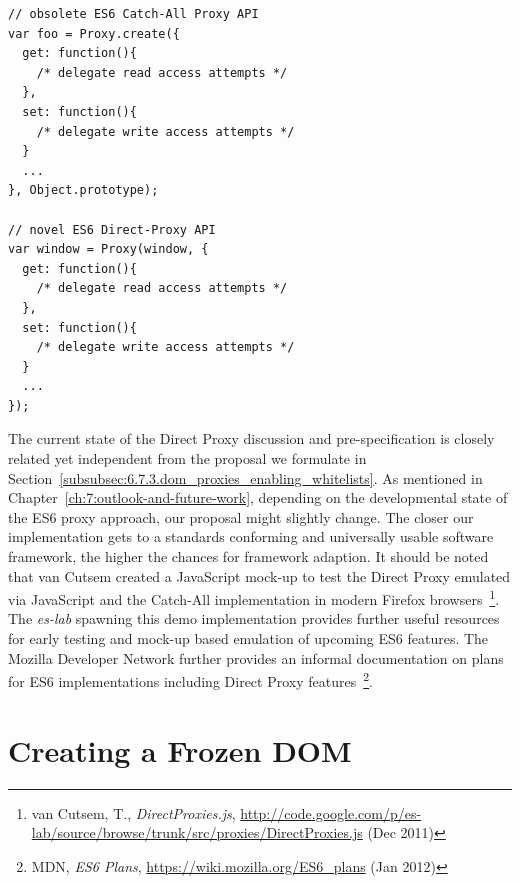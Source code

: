 \begin{lstlisting}[captionpos=b,label=lst:proxy-example-code,caption=Example code for Catch-All and Direct-Proxy implementations]
// obsolete ES6 Catch-All Proxy API
var foo = Proxy.create({
  get: function(){
    /* delegate read access attempts */
  },
  set: function(){
    /* delegate write access attempts */
  }
  ...
}, Object.prototype); 

// novel ES6 Direct-Proxy API
var window = Proxy(window, {
  get: function(){
    /* delegate read access attempts */
  },
  set: function(){
    /* delegate write access attempts */
  }
  ...
});
\end{lstlisting}

      The current state of the Direct Proxy discussion and pre-specification is closely related yet independent from the proposal we formulate in Section~\ref{subsubsec:6.7.3.dom_proxies_enabling_whitelists}. As mentioned in Chapter~\ref{ch:7:outlook-and-future-work}, depending on the developmental state of the ES6 proxy approach, our proposal might slightly change. The closer our implementation gets to a standards conforming and universally usable software framework, the higher the chances for framework adaption. It should be noted that van Cutsem created a JavaScript mock-up to test the Direct Proxy emulated via JavaScript and the Catch-All implementation in modern Firefox browsers~\footnote{van Cutsem, T., \textit{DirectProxies.js}, \url{http://code.google.com/p/es-lab/source/browse/trunk/src/proxies/DirectProxies.js} (Dec 2011)}. The \textit{es-lab} spawning this demo implementation provides further useful resources for early testing and mock-up based emulation of upcoming ES6 features. The Mozilla Developer Network further provides an informal documentation on plans for ES6 implementations including Direct Proxy features~\footnote{MDN, \textit{ES6 Plans}, \url{https://wiki.mozilla.org/ES6_plans} (Jan 2012)}.

    \section{Creating a Frozen DOM}
    \label{subsec:6.4.creating_a_frozen_dom}

